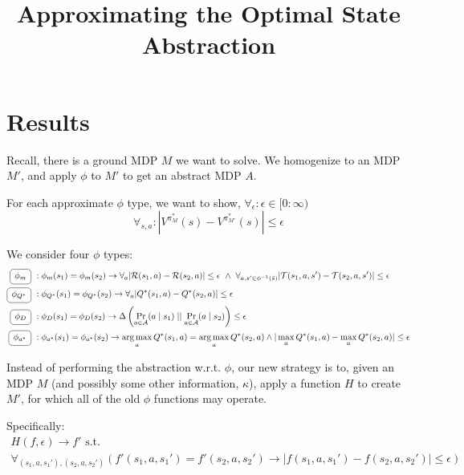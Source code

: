 \documentclass[11pt]{amsart}
\title{Approximating the Optimal State Abstraction}
\author{}
\date{}                                           %
\begin{document}
\maketitle
\section{Results}

Recall, there is a ground MDP $M$ we want to solve. We homogenize to an MDP $M'$, and apply $\phi$ to $M'$ to get an abstract MDP $A$.

For each approximate $\phi$ type, we want to show, $\forall_{\epsilon} : \epsilon \in [0 : \infty)$
\begin{equation}
\forall_{s,a} : | V^{\pi^*_M}(s) - V^{\pi^*_{M'}}(s) | \leq \epsilon
\end{equation}

We consider four $\phi$ types:
\begin{align*}
\encircle{\text{ $\phi_m$ }}\ & : \phi_{m}(s_1) = \phi_m(s_2) \rightarrow \forall_a |\mathcal{R}(s_1,a) - \mathcal{R}(s_2,a)| \leq \epsilon \ \wedge\ 
\forall_{a,s' \in \phi^{-1}(\bar{s})} | \mathcal{T}(s_1,a,s') - \mathcal{T}(s_2,a,s') | \leq \epsilon \\
\encircle{\text{ $\phi_{Q^*}$ }}\ & : \phi_{Q^*}(s_1) = \phi_{Q^*}(s_2) \rightarrow \forall_a |Q^*(s_1,a) - Q^*(s_2,a)| \leq \epsilon \\
\encircle{\text{ $\phi_{D}$ }}\ & : \phi_D(s_1) = \phi_D(s_2) \rightarrow \Delta \left( \Pr_{a \in \mathcal{A}}(a \mid s_1) \mid\mid \Pr_{a \in \mathcal{A}}(a \mid s_2) \right) \leq \epsilon \\
\encircle{\text{ $\phi_{a^*}$ }}\ & : \phi_{a^*}(s_1) = \phi_{a^*}(s_2) \rightarrow \argmax_a Q^*(s_1,a) = \argmax_a Q^*(s_2, a) \wedge |\max_a Q^*(s_1,a) - \max_a Q^*(s_2,a)| \leq \epsilon  \\
\end{align*}

 Instead of performing the abstraction w.r.t. $\phi$, our new strategy is to, given an MDP $M$ (and possibly some other information, $\kappa$), apply a function $H$ to create $M'$, for which all of the old $\phi$ functions may operate.

Specifically:
\begin{multline}
H(f, \epsilon) \rightarrow f' \text{  s.t.  } \\ \forall_{(s_1,a,s_1'),(s_2,a,s_2')} \left(f'(s_1,a,s_1') = f'(s_2,a,s_2') \rightarrow | f(s_1,a,s_1') - f(s_2,a,s_2') | \leq \epsilon\right)
\end{multline}
\end{document}
